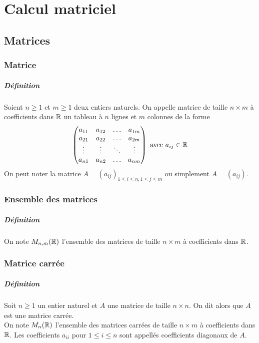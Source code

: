 \chapter{Calcul matriciel}

%
%
\section{Matrices}
%
%

%
\subsection{Matrice}
%
\paragraph{Définition} Soient $n \geq 1$ et $m \geq 1$ deux entiers naturels. On appelle matrice de taille $n\times m$ à coefficients dans $\mathbb{R}$ un tableau à $n$ lignes et $m$ colonnes de la forme
$$\begin{pmatrix}
  a_{11} & a_{12} & \ldots & a_{1m} \\
  a_{21} & a_{22} & \ldots & a_{2m} \\
  \vdots & \vdots & \ddots & \vdots \\
  a_{n1} & a_{n2} & \ldots & a_{nm}
\end{pmatrix} \text{ avec } a_{ij} \in \mathbb{R}$$
On peut noter la matrice $A = (a_{ij})_{1 \leq i \leq n, 1 \leq j \leq m}$ ou simplement $A = (a_{ij})$.

%
\subsection{Ensemble des matrices}
%
\paragraph{Définition} On note $M_{n, m}(\mathbb{R})$ l'ensemble des matrices de taille $n\times m$ à coefficients dans $\mathbb{R}$.

%
\subsection{Matrice carrée}
%
\paragraph{Définition} Soit $n \geq 1$ un entier naturel et $A$ une matrice de taille $n\times n$. On dit alors que $A$ est une matrice carrée. \\ 
On note $M_{n}(\mathbb{R})$ l'ensemble des matrices carrées de taille $n\times m$ à coefficients dans $\mathbb{R}$. Les coefficients $a_{ii}$ pour $1 \leq i \leq n$ sont appellés coefficients diagonaux de $A$.

